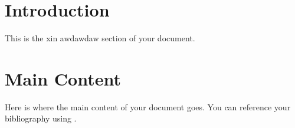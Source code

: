\documentclass[a4paper,12pt]{article}
\begin{document}


\section{Introduction}
This is the xin awdawdaw section of your document.

\section{Main Content}
Here is where the main content of your document goes. You can reference your bibliography using \cite{example_reference}.



\end{document}
